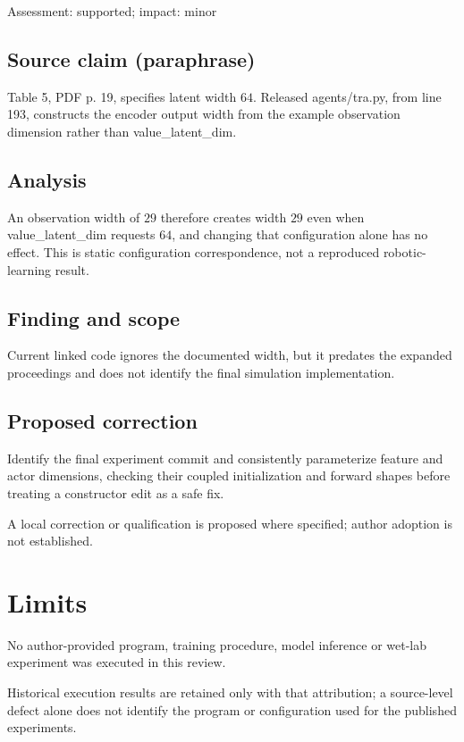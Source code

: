 \documentclass[11pt]{article}
\begin{document}
Assessment: supported; impact: minor

\subsection*{Source claim (paraphrase)}

Table 5, PDF p. 19, specifies latent width \(64\). Released agents/tra.py, from line 193, constructs the encoder output width from the example observation dimension rather than value\_latent\_dim.

\subsection*{Analysis}

An observation width of \(29\) therefore creates width \(29\) even when value\_latent\_dim requests \(64\), and changing that configuration alone has no effect. This is static configuration correspondence, not a reproduced robotic-learning result.

\subsection*{Finding and scope}

Current linked code ignores the documented width, but it predates the expanded proceedings and does not identify the final simulation implementation.

\subsection*{Proposed correction}

Identify the final experiment commit and consistently parameterize feature and actor dimensions, checking their coupled initialization and forward shapes before treating a constructor edit as a safe fix.

A local correction or qualification is proposed where specified; author adoption is not established.

\section*{Limits}

No author-provided program, training procedure, model inference or wet-lab experiment was executed in this review.\par

Historical execution results are retained only with that attribution; a source-level defect alone does not identify the program or configuration used for the published experiments.\par
\end{document}
